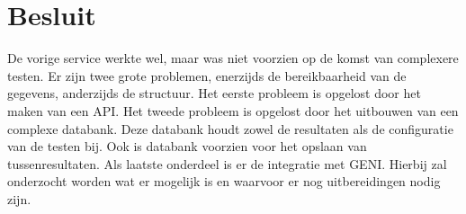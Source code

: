 \section{Besluit}
De vorige service werkte wel, maar was niet voorzien op de komst van complexere testen. Er zijn twee grote problemen, enerzijds de bereikbaarheid van de gegevens, anderzijds de structuur. Het eerste probleem is opgelost door het maken van een API. Het tweede probleem is opgelost door het uitbouwen van een complexe databank. Deze databank houdt zowel de resultaten als de configuratie van de testen bij. Ook is databank voorzien voor het opslaan van tussenresultaten. Als laatste onderdeel is er de integratie met GENI. Hierbij zal onderzocht worden wat er mogelijk is en waarvoor er nog uitbereidingen nodig zijn.